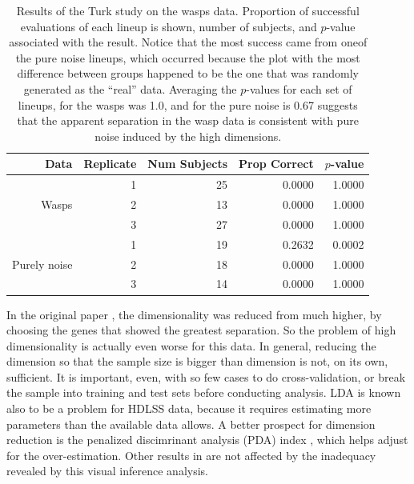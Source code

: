 \documentclass[12]{article}
\begin{document}
\begin{table}[ht]
\begin{center}
\caption{Results of the Turk study on the wasps data. Proportion of successful evaluations of each lineup is shown, number of subjects, and $p$-value associated with the result. Notice that the most success came from oneof the pure noise lineups, which occurred because the plot with the most difference between groups happened to be the one that was randomly generated as the ``real'' data. Averaging the $p$-values for each set of lineups, for the wasps was 1.0, and for the pure noise is 0.67 suggests that the apparent separation in the wasp data is consistent with pure noise induced by the high dimensions.}
\vspace{0.15cm}
\begin{tabular}{r|r|r|rr}
\hline
  \hline
 Data & Replicate & Num Subjects & Prop Correct & $p$-value\\ 
  \hline
  & 1 & 25 & 0.0000 &  1.0000\\
Wasps & 2 & 13 & 0.0000 &  1.0000\\ 
 & 3 & 27 & 0.0000 &  1.0000\\
 \hline
 & 1 & 19 & 0.2632 &  0.0002\\
Purely noise & 2 & 18 & 0.0000 &  1.0000 \\ 
 & 3 & 14 & 0.0000 &  1.0000\\
   \hline
\end{tabular}
\label{wasp}
\end{center}
\end{table}

In the original paper \citep{toth:2010}, the dimensionality was reduced from much higher, by choosing the genes that showed the greatest separation. So the problem of high dimensionality is actually even worse for this data. In general, reducing the dimension so that the sample size is bigger than dimension is not, on its own, sufficient. It is important, even, with so few cases to do cross-validation, or break the sample into training and test sets before conducting analysis. LDA is known also to be a problem for HDLSS data, because it requires estimating more parameters than the available data allows. A better prospect for dimension reduction is the penalized discimrinant analysis (PDA) index \citep{lee:2009}, which helps adjust for the over-estimation. Other results in \cite{toth:2010} are not affected by the inadequacy revealed by this visual inference analysis.
\end{document}
